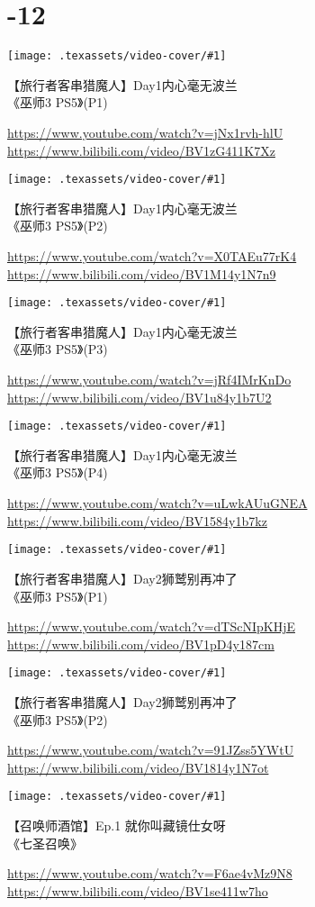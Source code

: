 


\newcommand{\videoitem}[4]{
    \parbox[b][29mm][b]{\linewidth}{%
        \texttt{[image: .texassets/video-cover/\#1]}%
        \hfill%
        \parbox[b][29mm][b]{27em}{
            \raggedright
            \large#2\par\vfill
            \footnotesize\ttfamily
            \textcolor{gray}{%
                \href{https://www.youtube.com/watch?v=#3}{https://www.youtube.com/watch?v=#3}\linebreak%
                \href{https://www.bilibili.com/video/#4}{https://www.bilibili.com/video/#4}%
            }\par\vskip 2pt%
        }%
    }%
    \par
    \vskip 11pt
}




\section*{-12}

\videoitem{wit3ps5/wit3ps5-day001-1}{【旅行者客串猎魔人】Day1内心毫无波兰\\《巫师3 PS5》(P1)}{jNx1rvh-hlU}{BV1zG411K7Xz}
\videoitem{wit3ps5/wit3ps5-day001-2}{【旅行者客串猎魔人】Day1内心毫无波兰\\《巫师3 PS5》(P2)}{X0TAEu77rK4}{BV1M14y1N7n9}
\videoitem{wit3ps5/wit3ps5-day001-3}{【旅行者客串猎魔人】Day1内心毫无波兰\\《巫师3 PS5》(P3)}{jRf4IMrKnDo}{BV1u84y1b7U2}
\videoitem{wit3ps5/wit3ps5-day001-4}{【旅行者客串猎魔人】Day1内心毫无波兰\\《巫师3 PS5》(P4)}{uLwkAUuGNEA}{BV1584y1b7kz}
\videoitem{wit3ps5/wit3ps5-day002-1}{【旅行者客串猎魔人】Day2狮鹫别再冲了\\《巫师3 PS5》(P1)}{dTScNIpKHjE}{BV1pD4y187cm}
\videoitem{wit3ps5/wit3ps5-day002-2}{【旅行者客串猎魔人】Day2狮鹫别再冲了\\《巫师3 PS5》(P2)}{91JZss5YWtU}{BV1814y1N7ot}

\videoitem{ys-geninv/ysgi-0001}{【召唤师酒馆】Ep.1 就你叫藏镜仕女呀\\《七圣召唤》}{F6ae4vMz9N8}{BV1se411w7ho}



